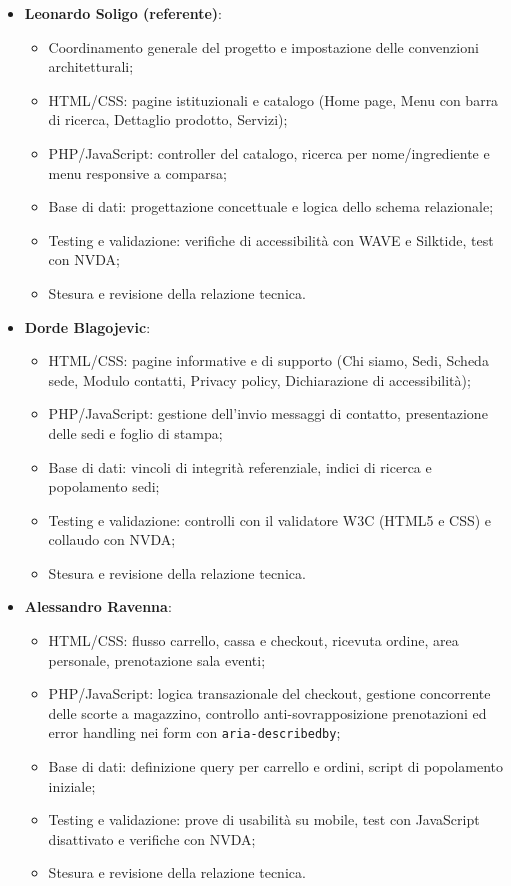 \documentclass[a4paper,11pt]{article}
\begin{document}
\begin{itemize}
    \item \textbf{Leonardo Soligo (referente)}:
    \begin{itemize}
        \item Coordinamento generale del progetto e impostazione delle convenzioni architetturali;
        \item HTML/CSS: pagine istituzionali e catalogo (Home page, Menu con barra di ricerca, Dettaglio prodotto, Servizi);
        \item PHP/JavaScript: controller del catalogo, ricerca per nome/ingrediente e menu responsive a comparsa;
        \item Base di dati: progettazione concettuale e logica dello schema relazionale;
        \item Testing e validazione: verifiche di accessibilità con WAVE e Silktide, test con NVDA;
        \item Stesura e revisione della relazione tecnica.
    \end{itemize}

    \item \textbf{Dorde Blagojevic}:
    \begin{itemize}
        \item HTML/CSS: pagine informative e di supporto (Chi siamo, Sedi, Scheda sede, Modulo contatti, Privacy policy, Dichiarazione di accessibilità);
        \item PHP/JavaScript: gestione dell'invio messaggi di contatto, presentazione delle sedi e foglio di stampa;
        \item Base di dati: vincoli di integrità referenziale, indici di ricerca e popolamento sedi;
        \item Testing e validazione: controlli con il validatore W3C (HTML5 e CSS) e collaudo con NVDA;
        \item Stesura e revisione della relazione tecnica.
    \end{itemize}

    \item \textbf{Alessandro Ravenna}:
    \begin{itemize}
        \item HTML/CSS: flusso carrello, cassa e checkout, ricevuta ordine, area personale, prenotazione sala eventi;
        \item PHP/JavaScript: logica transazionale del checkout, gestione concorrente delle scorte a magazzino, controllo anti-sovrapposizione prenotazioni ed error handling nei form con \texttt{aria-describedby};
        \item Base di dati: definizione query per carrello e ordini, script di popolamento iniziale;
        \item Testing e validazione: prove di usabilità su mobile, test con JavaScript disattivato e verifiche con NVDA;
        \item Stesura e revisione della relazione tecnica.
    \end{itemize}


\end{itemize}
\end{document}
